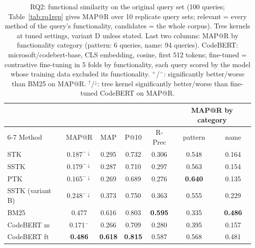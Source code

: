 \begin{table}[t]
\centering
\caption{RQ2: functional similarity on the original query set (100 queries; Table~\ref{tab:rq1rep} gives MAP@R over 10 replicate query sets; relevant = every method of the query's functionality, candidates = the whole corpus). Tree kernels at tuned settings, variant D unless stated. Last two columns: MAP@R by functionality category (pattern: 6 queries, name: 94 queries). CodeBERT: microsoft/codebert-base, CLS embedding, cosine, first 512 tokens; fine-tuned = contrastive fine-tuning in 5 folds by functionality, each query scored by the model whose training data excluded its functionality. $^{+}$/$^{-}$: significantly better/worse than BM25 on MAP@R. $^{\uparrow}$/$^{\downarrow}$: tree kernel significantly better/worse than fine-tuned CodeBERT on MAP@R. }
\label{tab:rq2}
\small
\begin{tabular}{lcccccc}
\toprule
 & & & & & \multicolumn{2}{c}{MAP@R by category} \\ \cmidrule(lr){6-7}
Method & MAP@R & MAP & P@10 & R-Prec & pattern & name \\
\midrule
STK & 0.187$^{-\downarrow}$ & 0.295 & 0.732 & 0.306 & 0.548 & 0.164 \\
SSTK & 0.179$^{-\downarrow}$ & 0.287 & 0.710 & 0.297 & 0.563 & 0.154 \\
PTK & 0.165$^{-\downarrow}$ & 0.269 & 0.689 & 0.276 & \textbf{0.640} & 0.135 \\
SSTK (variant B) & 0.248$^{-\downarrow}$ & 0.373 & 0.750 & 0.363 & 0.555 & 0.229 \\
\midrule
BM25 & 0.477 & 0.616 & 0.803 & \textbf{0.595} & 0.335 & \textbf{0.486} \\
CodeBERT zs & 0.171$^{-}$ & 0.266 & 0.709 & 0.280 & 0.395 & 0.157 \\
CodeBERT ft & \textbf{0.486} & \textbf{0.618} & \textbf{0.815} & 0.587 & 0.568 & 0.481 \\
\bottomrule
\end{tabular}
\end{table}
